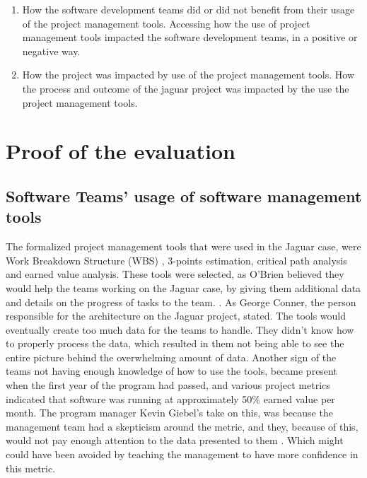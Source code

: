 \begin{enumerate}
    \item How the software development teams did or did not benefit from their usage of the project management tools.
    \subitem Accessing how the use of project management tools impacted the software development teams, in a positive or negative way.

    \item How the project was impacted by use of the project management tools.
    \subitem How the process and outcome of the jaguar project was impacted by the use the project management tools.
\end{enumerate}


\section{Proof of the evaluation}

\subsection{Software Teams' usage of software management tools}

The formalized project management tools that were used in the Jaguar case, were Work Breakdown Structure (WBS) \cite[p. 113]{Larson2021}, 3-points estimation, critical path analysis \cite[ch. 6]{Larson2021} and earned value analysis. These tools were selected, as O'Brien believed they would help the teams working on the Jaguar case, by giving them additional data and details on the progress of tasks to the team. \cite[p. 7]{GinoPisano2005}. 
As George Conner, the person responsible for the architecture on the Jaguar project, stated. The tools would eventually create too much data for the teams to handle. They didn't know how to properly process the data, which resulted in them not being able to see the entire picture behind the overwhelming amount of data.\cite[p. 13]{GinoPisano2005}
Another sign of the teams not having enough knowledge of how to use the tools, became present when the first year of the program had passed, and various project metrics indicated that software was running at approximately 50\% earned value per month. The program manager Kevin Giebel's take on this, was because the management team had a skepticism around the metric, and they, because of this, would not pay enough attention to the data presented to them \cite[p. 9]{GinoPisano2005}. Which might could have been avoided by teaching the management to have more confidence in this metric. 

